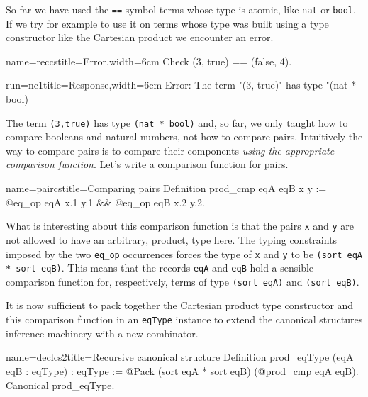 So far we have used the \lstinline/==/ symbol terms whose type is
atomic, like \lstinline/nat/ or \lstinline/bool/.  If we try for
example to use it on terms whose type was built using a type
constructor like the Cartesian product we encounter an error.

\begin{coq}{name=reccs}{title=Error,width=6cm}
Check (3, true) == (false, 4).
$~$
\end{coq}
\begin{coqout}{run=nc1}{title=Response,width=6cm}
Error: The term "(3, true)" has type "(nat * bool)%
\end{coqout}

The term \lstinline/(3,true)/ has type \lstinline/(nat * bool)/ and,
so far, we only taught \Coq{} how to compare booleans and natural
numbers, not how to compare pairs.
Intuitively the way to compare pairs is to compare their components
\emph{using the appropriate comparison function}.
Let's write a comparison function for pairs. 

\begin{coq}{name=paircs}{title=Comparing pairs}
Definition prod_cmp eqA eqB x y :=
  @eq_op eqA x.1 y.1 && @eq_op eqB x.2 y.2.
\end{coq}

What is interesting about this comparison function is that the
pairs \lstinline/x/ and \lstinline/y/ are not allowed to have
an arbitrary, product, type here.  The typing constraints imposed
by the two \lstinline/eq_op/ occurrences forces the type of
\lstinline/x/ and \lstinline/y/ to be
\lstinline/(sort eqA * sort eqB)/.  This means
that the records \lstinline/eqA/ and \lstinline/eqB/ hold
a sensible comparison function for, respectively, terms of
type \lstinline/(sort eqA)/ and \lstinline/(sort eqB)/.

It is now sufficient to pack together the Cartesian product type
constructor and this comparison function in an \lstinline/eqType/
instance to extend the canonical structures inference machinery
with a new combinator.

\begin{coq}{name=declcs2}{title=Recursive canonical structure}
Definition prod_eqType (eqA eqB : eqType) : eqType :=
  @Pack (sort eqA * sort eqB) (@prod_cmp eqA eqB).
Canonical prod_eqType.
\end{coq}

